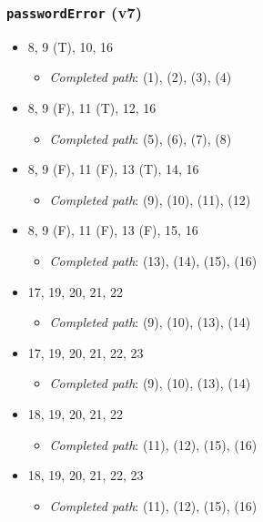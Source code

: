 \documentclass{article}
\newcommand{\completedpath}{\textit{Completed path}}
\begin{document}
\subsubsection*{\texttt{passwordError} (v7)}

\begin{itemize}
    \item 8, 9 (T), 10, 16
          \begin{itemize}
              \item \completedpath: (1), (2), (3), (4)
          \end{itemize}
    \item 8, 9 (F), 11 (T), 12, 16
          \begin{itemize}
              \item \completedpath: (5), (6), (7), (8)
          \end{itemize}
    \item 8, 9 (F), 11 (F), 13 (T), 14, 16
          \begin{itemize}
              \item \completedpath: (9), (10), (11), (12)
          \end{itemize}
    \item 8, 9 (F), 11 (F), 13 (F), 15, 16
          \begin{itemize}
              \item \completedpath: (13), (14), (15), (16)
          \end{itemize}
    \item 17, 19, 20, 21, 22
          \begin{itemize}
              \item \completedpath: (9), (10), (13), (14)
          \end{itemize}
    \item 17, 19, 20, 21, 22, 23
          \begin{itemize}
              \item \completedpath: (9), (10), (13), (14)
          \end{itemize}
    \item 18, 19, 20, 21, 22
          \begin{itemize}
              \item \completedpath: (11), (12), (15), (16)
          \end{itemize}
    \item 18, 19, 20, 21, 22, 23
          \begin{itemize}
              \item \completedpath: (11), (12), (15), (16)
          \end{itemize}
\end{itemize}
\end{document}
